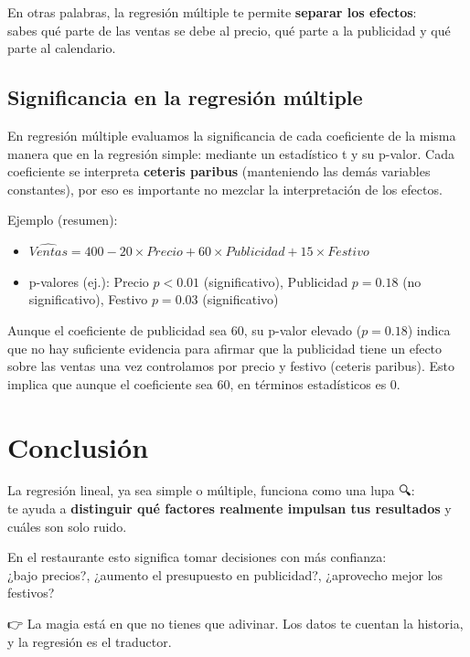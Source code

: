 \documentclass[
  spanish,
  letterpaper,
  DIV=11,
  numbers=noendperiod]{scrreprt}
\providecommand{\tightlist}{%
  \setlength{\itemsep}{0pt}\setlength{\parskip}{0pt}}
\begin{document}
En otras palabras, la regresión múltiple te permite \textbf{separar los
efectos}:\\
sabes qué parte de las ventas se debe al precio, qué parte a la
publicidad y qué parte al calendario.

\subsection{Significancia en la regresión
múltiple}\label{significancia-en-la-regresiuxf3n-muxfaltiple}

En regresión múltiple evaluamos la significancia de cada coeficiente de
la misma manera que en la regresión simple: mediante un estadístico t y
su p-valor. Cada coeficiente se interpreta \textbf{ceteris paribus}
(manteniendo las demás variables constantes), por eso es importante no
mezclar la interpretación de los efectos.

Ejemplo (resumen):

\begin{itemize}
\tightlist
\item
  \(\hat{Ventas} = 400 - 20\times Precio + 60\times Publicidad + 15\times Festivo\)
\item
  p-valores (ej.): Precio \(p<0.01\) (significativo), Publicidad
  \(p=0.18\) (no significativo), Festivo \(p=0.03\) (significativo)
\end{itemize}

Aunque el coeficiente de publicidad sea 60, su p-valor elevado
(\(p=0.18\)) indica que no hay suficiente evidencia para afirmar que la
publicidad tiene un efecto sobre las ventas una vez controlamos por
precio y festivo (ceteris paribus). Esto implica que aunque el
coeficiente sea 60, en términos estadísticos es 0.

\section{Conclusión}\label{conclusiuxf3n-1}

La regresión lineal, ya sea simple o múltiple, funciona como una lupa
🔍:\\
te ayuda a \textbf{distinguir qué factores realmente impulsan tus
resultados} y cuáles son solo ruido.

En el restaurante esto significa tomar decisiones con más confianza:\\
¿bajo precios?, ¿aumento el presupuesto en publicidad?, ¿aprovecho mejor
los festivos?

👉 La magia está en que no tienes que adivinar. Los datos te cuentan la
historia, y la regresión es el traductor.
\end{document}
